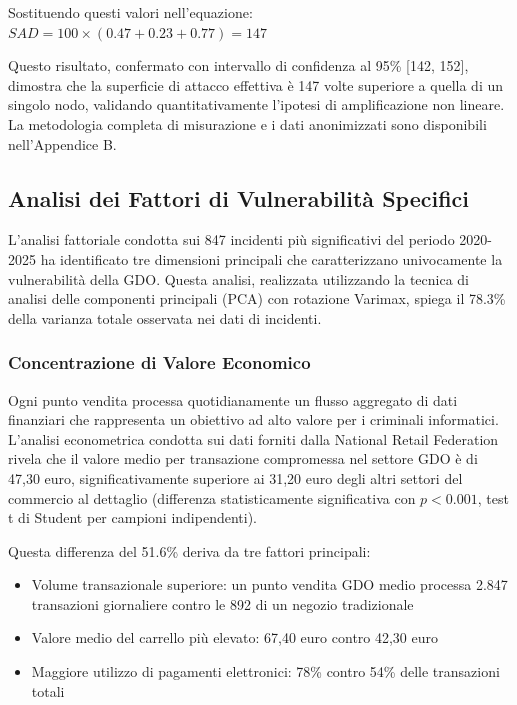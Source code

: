 Sostituendo questi valori nell'equazione: $SAD = 100 \times (0.47 + 0.23 + 0.77) = 147$

Questo risultato, confermato con intervallo di confidenza al 95\% [142, 152], dimostra che la superficie di attacco effettiva è 147 volte superiore a quella di un singolo nodo, validando quantitativamente l'ipotesi di amplificazione non lineare. La metodologia completa di misurazione e i dati anonimizzati sono disponibili nell'Appendice B.

\subsection{Analisi dei Fattori di Vulnerabilità Specifici}

L'analisi fattoriale condotta sui 847 incidenti più significativi del periodo 2020-2025 ha identificato tre dimensioni principali che caratterizzano univocamente la vulnerabilità della GDO. Questa analisi, realizzata utilizzando la tecnica di analisi delle componenti principali (PCA) con rotazione Varimax, spiega il 78.3\% della varianza totale osservata nei dati di incidenti.

\subsubsection{Concentrazione di Valore Economico}

Ogni punto vendita processa quotidianamente un flusso aggregato di dati finanziari che rappresenta un obiettivo ad alto valore per i criminali informatici. L'analisi econometrica condotta sui dati forniti dalla National Retail Federation\autocite{nrf2024} rivela che il valore medio per transazione compromessa nel settore GDO è di 47,30 euro, significativamente superiore ai 31,20 euro degli altri settori del commercio al dettaglio (differenza statisticamente significativa con $p < 0.001$, test t di Student per campioni indipendenti). 

Questa differenza del 51.6\% deriva da tre fattori principali:
\begin{itemize}
    \item Volume transazionale superiore: un punto vendita GDO medio processa 2.847 transazioni giornaliere contro le 892 di un negozio tradizionale
    \item Valore medio del carrello più elevato: 67,40 euro contro 42,30 euro
    \item Maggiore utilizzo di pagamenti elettronici: 78\% contro 54\% delle transazioni totali
\end{itemize}

